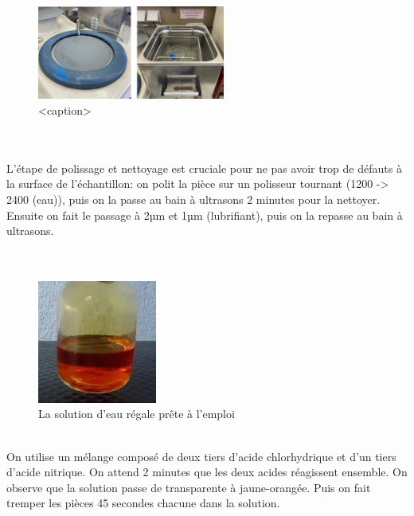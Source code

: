 
\begin{figure}[htbp]
    \centering
    \includegraphics[width=0.55\textwidth]{images/WechatIMG1126.jpeg}
    \caption{<caption>}
    \label{<label>}
\end{figure}

\\\\
L'étape de polissage et nettoyage est cruciale pour ne pas avoir 
trop de défauts à la surface de l'échantillon:
on polit la pièce sur un polisseur tournant (1200 -> 2400 (eau)), puis on la passe au bain à ultrasons 2 minutes pour la nettoyer.
Ensuite on fait le passage à 2µm et 1µm (lubrifiant),
puis on la repasse au bain à ultrasons.\\
\\
\\

\begin{figure}[htbp]
    \centering
    \includegraphics[width=0.35\textwidth]{images/WechatIMG1128.jpeg}
    \caption{La solution d'eau régale prête à l'emploi}
    \label{<label>}
\end{figure}
\\
On utilise un mélange composé de deux tiers d'acide chlorhydrique 
et d'un tiers d'acide nitrique.
On attend 2 minutes que les deux acides réagissent ensemble.
On observe que la solution passe de transparente à jaune-orangée.
Puis on fait tremper les pièces 45 secondes chacune dans la solution.
\\


